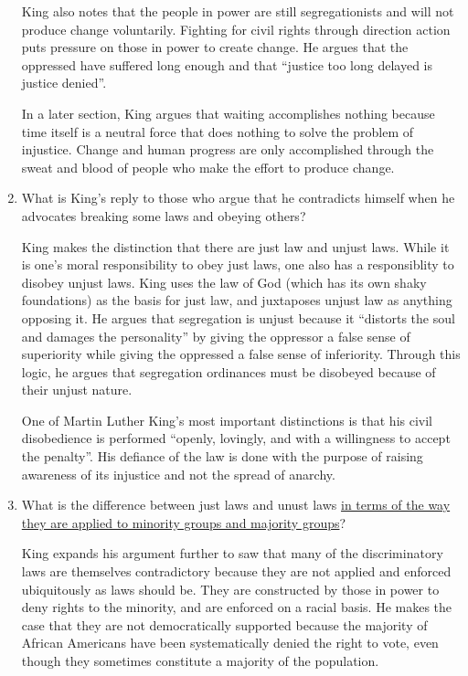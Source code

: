 \documentclass{article}
\begin{document}
\begin{enumerate}
  \par King also notes that the people in power are still segregationists and will not produce change voluntarily. Fighting for civil rights through direction action puts pressure on those in power to create change. He argues that the oppressed have suffered long enough and that ``justice too long delayed is justice denied''.
  \par In a later section, King argues that waiting accomplishes nothing because time itself is a neutral force that does nothing to solve the problem of injustice. Change and human progress are only accomplished through the sweat and blood of people who make the effort to produce change.
  \item What is King's reply to those who argue that he contradicts himself when he advocates breaking some laws and obeying others?
  \par King makes the distinction that there are just law and unjust laws. While it is one's moral responsibility to obey just laws, one also has a responsiblity to disobey unjust laws. King uses the law of God (which has its own shaky foundations) as the basis for just law, and juxtaposes unjust law as anything opposing it. He argues that segregation is unjust because it ``distorts the soul and damages the personality'' by giving the oppressor a false sense of superiority while giving the oppressed a false sense of inferiority. Through this logic, he argues that segregation ordinances must be disobeyed because of their unjust nature.
  \par One of Martin Luther King's most important distinctions is that his civil disobedience is performed ``openly, lovingly, and with a willingness to accept the penalty''. His defiance of the law is done with the purpose of raising awareness of its injustice and not the spread of anarchy.
  \item What is the difference between just laws and unust laws \ul{in terms of the way they are applied to minority groups and majority groups}?
  \par King expands his argument further to saw that many of the discriminatory laws are themselves contradictory because they are not applied and enforced ubiquitously as laws should be. They are constructed by those in power to deny rights to the minority, and are enforced on a racial basis. He makes the case that they are not democratically supported because the majority of African Americans have been systematically denied the right to vote, even though they sometimes constitute a majority of the population.

\end{enumerate}
\end{document}
